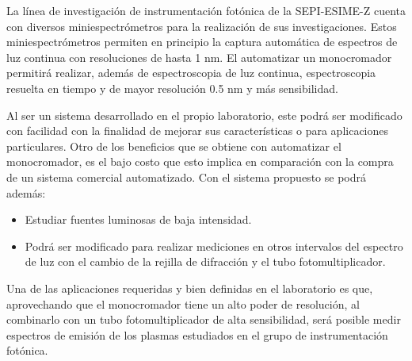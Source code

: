 La línea de investigación de instrumentación fotónica de la SEPI-ESIME-Z cuenta con diversos miniespectrómetros para la realización de sus investigaciones. Estos miniespectrómetros permiten en principio la captura automática de espectros de luz continua  con resoluciones de hasta 1 nm. El automatizar un monocromador permitirá realizar, además de espectroscopia de luz continua, espectroscopia resuelta en tiempo y de mayor resolución 0.5 nm y más sensibilidad.


Al ser un sistema desarrollado en el propio laboratorio, este podrá ser modificado con facilidad con la finalidad de mejorar sus características o para aplicaciones particulares. Otro de los beneficios que se obtiene con automatizar el monocromador, es el bajo costo que esto implica en comparación con la compra de un sistema comercial automatizado. Con el sistema propuesto se podrá además:
\begin{itemize}
\item Estudiar fuentes luminosas de baja intensidad.
\item Podrá ser modificado para realizar mediciones en otros intervalos del espectro de luz con el cambio de la rejilla de difracción y el tubo fotomultiplicador.
\end{itemize}

Una de las aplicaciones requeridas y bien definidas en el laboratorio es que, aprovechando que el monocromador tiene un alto poder de resolución, al combinarlo con un tubo fotomultiplicador de alta sensibilidad, será posible medir espectros de emisión de los plasmas estudiados en el grupo de instrumentación fotónica.
